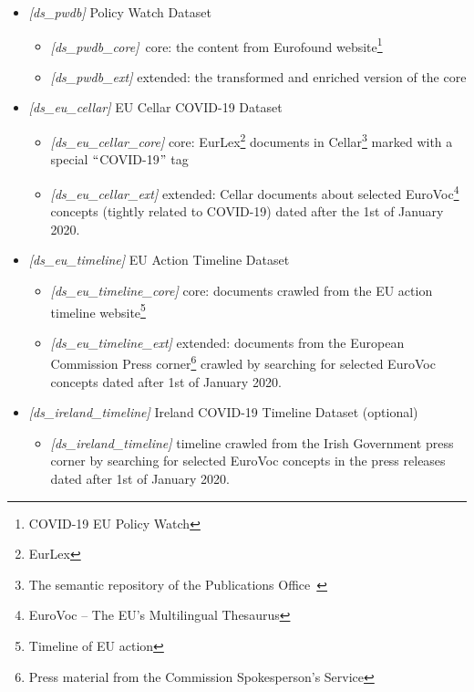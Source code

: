 \begin{itemize}
	\item \textit{[ds\_pwdb]} Policy Watch Dataset 
        \begin{itemize}
        	\item \textit{[ds\_pwdb\_core]}\ core:  the content from Eurofound website\footnote{ COVID-19 EU Policy Watch }
        	\item \textit{[ds\_pwdb\_ext]} extended: the transformed and enriched version of the core
        \end{itemize}
	\item \textit{[ds\_eu\_cellar]} EU Cellar COVID-19 Dataset 
        \begin{itemize}
        	\item \textit{[ds\_eu\_cellar\_core]} core: EurLex\footnote{ EurLex } documents in Cellar\footnote{ The semantic repository of the Publications Office\   } marked with a special $``$COVID-19$"$  tag
        	\item \textit{[ds\_eu\_cellar\_ext]} extended: Cellar documents about selected EuroVoc\footnote{ EuroVoc – The EU's Multilingual Thesaurus } concepts (tightly related to COVID-19) dated after the 1st of January 2020.
        \end{itemize}
	\item \textit{[ds\_eu\_timeline]} EU Action Timeline Dataset 
        \begin{itemize}
        	\item \textit{[ds\_eu\_timeline\_core]} core: documents crawled from the EU action timeline website\footnote{ Timeline of EU action } 
        	\item \textit{[ds\_eu\_timeline\_ext]} extended: documents from the European Commission Press corner\footnote{ Press material from the Commission Spokesperson's Service } crawled by searching for selected EuroVoc concepts dated after 1st of January 2020.
        \end{itemize}
	\item \textit{[ds\_ireland\_timeline]} Ireland COVID-19 Timeline Dataset (optional)
        \begin{itemize}
        	\item \textit{[ds\_ireland\_timeline] }timeline crawled from the Irish Government press corner by searching for selected EuroVoc concepts in the press releases dated after 1st of January 2020. 
        \end{itemize}
\end{itemize}


